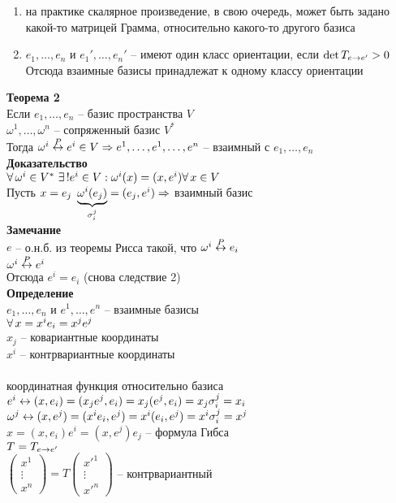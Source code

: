 \documentclass[12pt]{article}
\begin{document}
\begin{enumerate}
    \item на практике скалярное произведение, в свою очередь, может быть задано какой-то матрицей Грамма, относительно какого-то другого базиса
    \item $e_1, \ldots, e_n$ и $e_1', \ldots, e_n'$ -- имеют один класс ориентации, если $\det T_{e\rto e'} > 0$\\
    Отсюда взаимные базисы принадлежат к одному классу ориентации
\end{enumerate}
\textbf{Теорема 2}\\
Если $e_1, \ldots, e_n$ -- базис пространства $V$\\
$\omega^1, \ldots, \omega^n$ -- сопряженный базис $V^*$\\
Тогда $\omega^i \os{P}\lrto e^i \in V \Rto e^1, \ldots, e^1, \ldots, e^n$ -- взаимный с $e_1, \ldots, e_n$\\
\textbf{Доказательство}\\
$\fall \omega^i \in V^*\ \ex! e^i \in V: \omega^i(x) = (x, e^i) \fall x \in V$\\
Пусть $x = e_j\ \ub{\sigma_i^j}{\omega^i(e_j)} = (e_j, e^i) \Rto $ взаимный базис\\
\textbf{Замечание}\\
$e$ -- о.н.б. из теоремы Рисса такой, что $\omega^i \os P\lrto e_i$\\
$\omega^i \os P\lrto e^i$\\
Отсюда $e^i = e_i$ (снова следствие 2)\\
\textbf{Определение}\\
$e_1, \ldots, e_n$ и $e^1, \ldots, e^n$ -- взаимные базисы\\
$\fall x = x^ie_i = x^j e^j$\\
$x_j$ -- ковариантные координаты\\
$x^i$ -- контрвариантные координаты\\\\
координатная функция относительно базиса $e^i \lrto (x, e_i) = (x_j e^j, e_i) = x_j (e^j, e_i) = x_j \sigma_i^j = x_i$\\
$\omega^j \lrto (x, e^j) = (x^i e_i, e^j) = x^i(e_i, e^j) = x^i\sigma^j_i = x^j$\\
$x = (x, e_i)e^i = (x, e^j)e_j$ -- формула Гибса\\
$T= T_{e\rto e'}$\\
$\begin{pmatrix}x^1\\\vdots\\x^n\end{pmatrix} = T\begin{pmatrix}x'^1\\\vdots\\x'^n\end{pmatrix}$ -- контрвариантный\\
\end{document}
